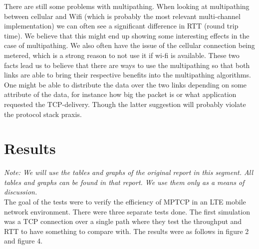 \documentclass[11pt,twocolumn]{article}
\begin{document}
There are still some problems with multipathing. When looking at multipathing between cellular and Wifi (which is probably the most relevant multi-channel implementation) we can often see a significant difference in RTT (round trip time). We believe that this might end up showing some interesting effects in the case of multipathing. We also often have the issue of the cellular connection being metered, which is a strong reason to not use it if wi-fi is available. These two facts lead us to believe that there are ways to use the multipathing so that both links are able to bring their respective benefits into the multipathing algorithms. One might be able to distribute the data over the two links depending on some attribute of the data, for instance how big the packet is or what application requested the TCP-delivery. Though the latter suggestion will probably violate the protocol stack praxis.

\section{Results}

\emph{Note: We will use the tables and graphs of the original report\cite{MPTCP-LTE} in this segment. All tables and graphs can be found in that report. We use them only as a means of discussion.} \\

The goal of the tests were to verify the efficiency of MPTCP in an LTE mobile network environment. There were three separate tests done. The first simulation was a TCP connection over a single path where they test the throughput and RTT to have something to compare with. The results were as follows in figure 2 and figure 4.
\end{document}
